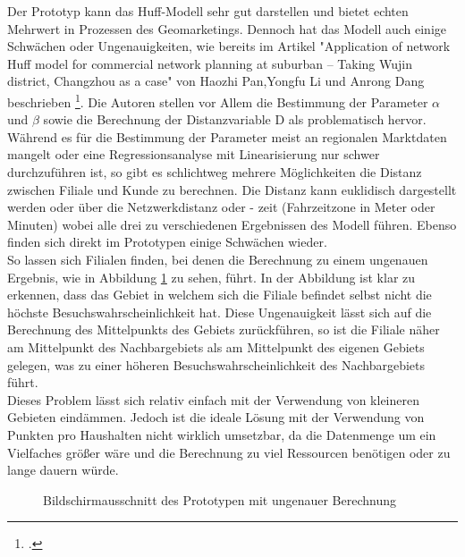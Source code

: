 Der Prototyp kann das Huff-Modell sehr gut darstellen und bietet echten Mehrwert in Prozessen des Geomarketings.
Dennoch hat das Modell auch einige Schwächen oder Ungenauigkeiten, wie bereits im Artikel "Application of network Huff model for commercial network planning at suburban – Taking Wujin district, Changzhou as a case" von Haozhi Pan,Yongfu Li und Anrong Dang beschrieben \footcite{pan_application_2013}.
Die Autoren stellen vor Allem die Bestimmung der Parameter $\alpha$ und $\beta$ sowie die Berechnung der Distanzvariable D als problematisch hervor.
Während es für die Bestimmung der Parameter meist an regionalen Marktdaten mangelt oder eine Regressionsanalyse mit Linearisierung nur schwer durchzuführen ist, so gibt es schlichtweg mehrere Möglichkeiten die Distanz zwischen Filiale und Kunde zu berechnen.
Die Distanz kann euklidisch dargestellt werden oder über die Netzwerkdistanz oder - zeit (Fahrzeitzone in Meter oder Minuten) wobei alle drei zu verschiedenen Ergebnissen des Modell führen.
Ebenso finden sich direkt im Prototypen einige Schwächen wieder.\\
So lassen sich Filialen finden, bei denen die Berechnung zu einem ungenauen Ergebnis, wie in Abbildung \ref{img:innacc_store} zu sehen, führt.
In der Abbildung ist klar zu erkennen, dass das Gebiet in welchem sich die Filiale befindet selbst nicht die höchste Besuchswahrscheinlichkeit hat.
Diese Ungenauigkeit lässt sich auf die Berechnung des Mittelpunkts des Gebiets zurückführen, so ist die Filiale näher am Mittelpunkt des Nachbargebiets als am Mittelpunkt des eigenen Gebiets gelegen, was zu einer höheren Besuchswahrscheinlichkeit des Nachbargebiets führt.\\
Dieses Problem lässt sich relativ einfach mit der Verwendung von kleineren Gebieten eindämmen.
Jedoch ist die ideale Lösung mit der Verwendung von Punkten pro Haushalten nicht wirklich umsetzbar, da die Datenmenge um ein Vielfaches größer wäre und die Berechnung zu viel Ressourcen benötigen oder zu lange dauern würde.

\begin{figure}[H]
	\caption{Bildschirmausschnitt des Prototypen mit ungenauer Berechnung}
	\label{img:innacc_store}
\end{figure}

